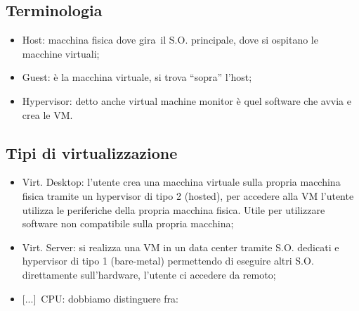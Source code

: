 \documentclass[
]{article}
\providecommand{\tightlist}{%
  \setlength{\itemsep}{0pt}\setlength{\parskip}{0pt}}
\begin{document}
\subsection{\texorpdfstring{{Terminologia}}{Terminologia}}\label{h.29k94dsrwn6p}

\begin{itemize}
\tightlist
\item
  {Host}{: macchina fisica dove gir}{a}{~il S.O. principale, dove si
  ospitano le macchine virtuali;}
\end{itemize}

{}

\begin{itemize}
\tightlist
\item
  {Guest}{: è la macchina virtuale, si trova ``sopra'' l'host;}
\end{itemize}

{}

\begin{itemize}
\tightlist
\item
  {Hypervisor}{: detto anche virtual machine monitor è quel software che
  avvia e crea le VM.}
\end{itemize}

\subsection{\texorpdfstring{{Tipi di
virtualizzazione}}{Tipi di virtualizzazione}}\label{h.6hzz4zvpzhiw}

\begin{itemize}
\tightlist
\item
  {Virt. Desktop}{: l'utente crea una macchina virtuale sulla propria
  macchina fisica tramite un hypervisor di tipo 2 (hosted), per accedere
  alla VM l'utente utilizza le periferiche della propria macchina
  fisica. Utile per utilizzare software non compatibile sulla propria
  macchina;}
\end{itemize}

{}

\begin{itemize}
\tightlist
\item
  {Virt. Server}{: si realizza una VM in un data center tramite S.O.
  dedicati e hypervisor di tipo 1 (bare-metal) permettendo di eseguire
  altri S.O. direttamente sull'hardware, l'utente ci accedere da
  remoto;}
\end{itemize}

{}

\begin{itemize}
\tightlist
\item
  {{[}...{]}}{~CPU}{: dobbiamo distinguere fra:}
\end{itemize}
\end{document}
